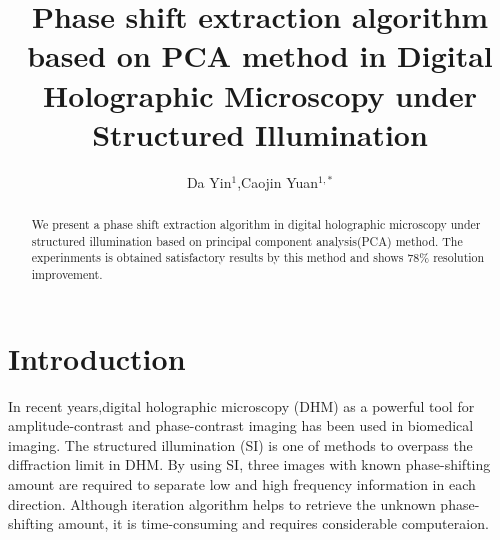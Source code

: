 \documentclass[letterpaper,10pt]{article}
\begin{document}
\title{Phase shift extraction algorithm based on PCA method in Digital Holographic Microscopy under Structured Illumination}

\author{Da Yin$^1$,Caojin Yuan$^{1,*}$}
\address{$^1$Key Laboratory for Opto-Electronic Technology of Jiangsu Province, Nanjing Normal University, Nanjing, 210023, China}



\begin{abstract}
We present a phase shift extraction algorithm in digital holographic microscopy under structured illumination based on principal component analysis(PCA) method.
The experinments is obtained satisfactory results by this method and shows $78\%$ resolution improvement.
\end{abstract}


\section{Introduction}
In recent years,digital holographic microscopy (DHM) as a powerful tool for amplitude-contrast and phase-contrast imaging has been used in biomedical imaging.
The structured illumination (SI) is one of methods to overpass the diffraction limit in DHM\cite{Mico2006}.
By using SI, three images with known phase-shifting amount are required to separate low and high frequency information in each direction.
Although iteration algorithm helps to retrieve the unknown phase-shifting amount, it is time-consuming and requires considerable computeraion\cite{Zheng2014}.
\end{document}
